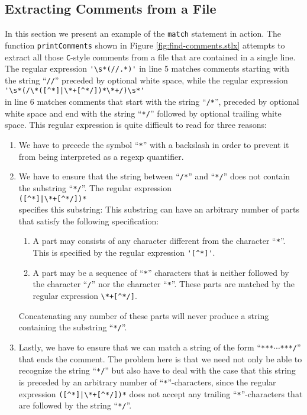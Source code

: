 \subsection{Extracting Comments from a File}
In this section we present an example of the  \texttt{match} statement in action.  The
function \texttt{printComments} shown in Figure \ref{fig:find-comments.stlx} attempts to
extract all those \texttt{C}-style comments from a file that are contained in a single
line.  The regular expression \verb|'\s*(//.*)'| in line 5 matches comments starting
with the string ``\texttt{//}'' preceded by optional white space, while the regular expression
\\[0.2cm]
\hspace*{1.3cm}
\verb"'\s*(/\*([^*]|\*+[^*/])*\*+/)\s*'"
\\[0.2cm]
in line 6 matches comments that start with the string ``\texttt{/*}'', preceded by optional
white space and end with the string ``\texttt{*/}'' followed by optional trailing white space.  This
regular expression is quite difficult to read for three reasons:
\begin{enumerate}
\item We have to precede the symbol ``\texttt{*}'' with a backslash in order to prevent it
      from being interpreted as a regexp quantifier.
\item We have to ensure that the string between  ``\texttt{/*}'' and ``\texttt{*/}'' does
      not contain the substring ``\texttt{*/}''.  The regular expression
      \\[0.2cm]
      \hspace*{1.3cm}
      \verb"([^*]|\*+[^*/])*"
      \\[0.2cm]
      specifies this substring:  This substring can have an arbitrary number of parts
      that satisfy the following specification:
      \begin{enumerate}
      \item A part may consists of any character different from
            the character ``\texttt{*}''.  This is specified by the regular expression
            \verb"'[^*]'".
      \item A part may be a sequence of ``\texttt{*}'' characters
            that is neither followed by the character ``\texttt{/}'' nor the character
            ``\texttt{*}''.   These parts are matched by the regular expression
            \verb"\*+[^*/]".
      \end{enumerate}
      Concatenating any number of these parts will never produce a string containing the
      substring ``\texttt{*/}''.
\item Lastly, we have to ensure that we can match a string of the form
      ``\texttt{***}$\cdots$\texttt{***/}'' that ends the comment.  The problem here is that
      we need not only be able to recognize the string ``\texttt{*/}'' but also have to deal with
      the case that this string is preceded by an arbitrary number of ``\texttt{*}''-characters,
      since the regular expression \verb"([^*]|\*+[^*/])*" does not accept any trailing
      ``\texttt{*}''-characters that are followed by the string ``\texttt{*/}''.
\end{enumerate}

